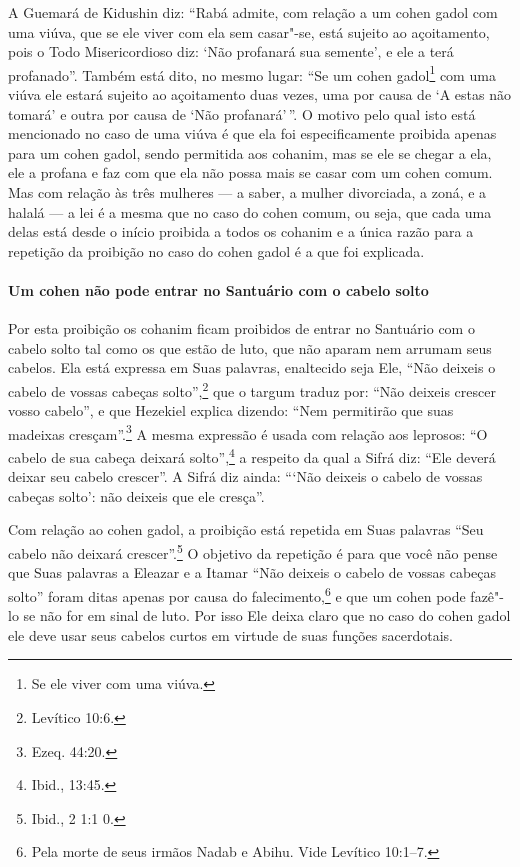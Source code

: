 \begin{multicols}{2}
A Guemará\starr{} de Kidushin\starr{} diz: ``Rabá\starr{} admite, com relação a um cohen
gadol\starr{} com uma viúva, que se ele viver com ela sem casar"-se, está
sujeito ao açoitamento, pois o Todo Misericordioso diz: `Não profanará
sua semente', e ele a terá profanado''. Também está dito, no mesmo
lugar: ``Se um cohen gadol\starr\footnote{Se ele viver com uma viúva.} com uma viúva ele estará sujeito ao açoitamento duas vezes, uma por causa de `A estas não
tomará' e outra por causa de `Não profanará'\,''. O motivo pelo qual isto
está mencionado no caso de uma viúva é que ela foi especificamente
proibida apenas para um cohen gadol\starr, sendo permitida aos
cohanim\starr, mas se ele se chegar a ela, ele a profana e faz com que
ela não possa mais se casar com um cohen\starr{} comum. Mas com relação às
três mulheres --- a saber, a mulher divorciada, a zoná\starr, e a halalá\starr{} --- a lei é a mesma que no caso do cohen\starr{} comum, ou seja, que cada uma delas está desde o
início proibida a todos os cohanim\starr{} e a única razão para a repetição
da proibição no caso do cohen gadol\starr{} é a que foi explicada.

\paragraph{Um cohen\starr{} não pode entrar no Santuário com o cabelo solto}

Por esta proibição os cohanim\starr{} ficam proibidos de entrar no Santuário
com o cabelo solto tal como os que estão de luto, que não aparam nem
arrumam seus cabelos. Ela está expressa em Suas palavras, enaltecido
seja Ele, ``Não deixeis o cabelo de vossas cabeças solto'',\footnote{Levítico
10:6.} que o targum\starr{} traduz por: ``Não deixeis crescer vosso cabelo'', e
que Hezekiel\starr{} explica dizendo: ``Nem permitirão que suas madeixas
cresçam''.\footnote{Ezeq. 44:20.} A mesma expressão é usada com relação
aos leprosos: ``O cabelo de sua cabeça deixará solto'',\footnote{Ibid., 13:45.} a
respeito da qual a Sifrá\starr{} diz: ``Ele deverá deixar seu cabelo crescer''.
A Sifrá\starr{} diz ainda: ```Não deixeis o cabelo de vossas cabeças solto': não
deixeis que ele cresça''.

Com relação ao cohen gadol\starr, a proibição está repetida em Suas
palavras ``Seu cabelo não deixará crescer''.\footnote{Ibid., 2 1:1 0.} O objetivo
da repetição é para que você não pense que Suas palavras a Eleazar\starr{} e a
Itamar\starr{} ``Não deixeis o cabelo de vossas cabeças solto'' foram ditas
apenas por causa do falecimento,\footnote{Pela morte de seus irmãos Nadab e Abihu. Vide Levítico 10:1--7.} e que um
cohen\starr{} pode fazê"-lo se não for em sinal de luto. Por isso Ele deixa
claro que no caso do cohen gadol\starr{} ele deve usar seus cabelos curtos
em virtude de suas funções sacerdotais.


\end{multicols}
